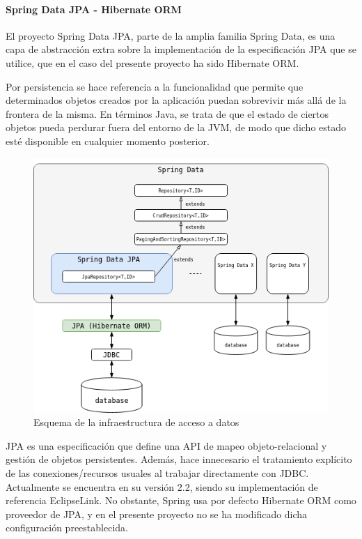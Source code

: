\documentclass[a4paper]{article}
\begin{document}
    \paragraph{Spring Data JPA - Hibernate ORM}
    El proyecto Spring Data JPA, parte de la amplia familia Spring Data, es una capa de abstracción extra sobre la implementación de la especificación JPA que se utilice, que en el caso del presente proyecto ha sido Hibernate ORM.
    
    Por persistencia se hace referencia a la funcionalidad que permite que determinados objetos creados por la aplicación puedan sobrevivir más allá de la frontera de la misma. En términos Java, se trata de que el estado de ciertos objetos pueda perdurar fuera del entorno de la JVM, de modo que dicho estado esté disponible en cualquier momento posterior.
    
    \begin{figure}[hbt!]
    	\centering
    	\includegraphics[width=\textwidth,keepaspectratio]{data_access}
    	\caption{Esquema de la infraestructura de acceso a datos}
    	\label{fig:data_access}
    \end{figure}
    
    JPA es una especificación que define una API de mapeo objeto-relacional y gestión de objetos persistentes. Además, hace innecesario el tratamiento explícito de las conexiones/recursos usuales al trabajar directamente con JDBC. Actualmente se encuentra en su versión 2.2, siendo su implementación de referencia EclipseLink. No obstante, Spring usa por defecto Hibernate ORM como proveedor de JPA, y en el presente proyecto no se ha modificado dicha configuración preestablecida.
    
\end{document}
